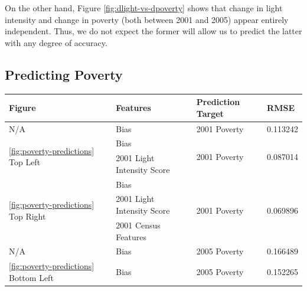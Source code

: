 \documentclass[10pt, letterpaper]{article}
\theoremstyle{plain}
\theoremstyle{definition}
\begin{document}
  On the other hand, Figure \ref{fig:dlight-vs-dpoverty} shows that change in light intensity and change in poverty (both between 2001 and 2005) appear entirely independent. Thus, we do not expect the former will allow us to predict the latter with any degree of accuracy.

\subsection{Predicting Poverty}

\begin{table}
  \centering
\begin{tabular}{| l | l | l | l |}
  \hline
  Figure                                          & Features                      & Prediction Target             & RMSE                      \\
  \hline
  N/A                                             & Bias                          & 2001 Poverty                  & 0.113242                  \\
  \hline
  \multirow{2}{*}{\ref{fig:poverty-predictions} Top Left}         & Bias                          & \multirow{2}{*}{2001 Poverty} & \multirow{2}{*}{0.087014} \\
                                                  & 2001 Light Intensity Score    &                               &                           \\
  \hline
  \multirow{3}{*}{\ref{fig:poverty-predictions} Top Right}  & Bias                          & \multirow{3}{*}{2001 Poverty} & \multirow{3}{*}{0.069896} \\
                                                  & 2001 Light Intensity Score    &                               &                           \\
                                                  & 2001 Census Features          &                               &                           \\
  \hline
  N/A                                             & Bias                          & 2005 Poverty                  & 0.166489                  \\
  \hline
  \multirow{2}{*}{\ref{fig:poverty-predictions} Bottom Left}         & Bias                          & \multirow{2}{*}{2005 Poverty} & \multirow{2}{*}{0.152265} \\

\end{tabular}
\end{table}
\end{document}
